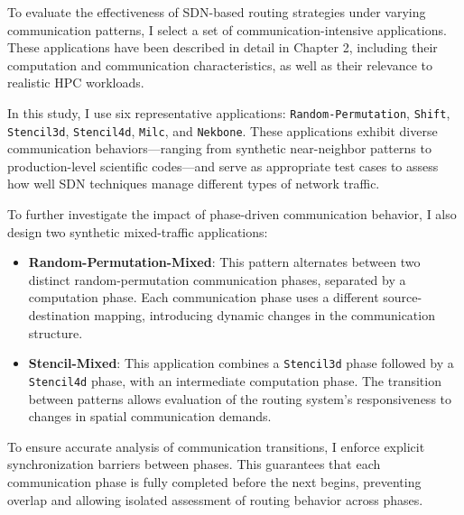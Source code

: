 To evaluate the effectiveness of SDN-based routing strategies under varying communication patterns, I select a set of communication-intensive applications. These applications have been described in detail in Chapter 2, including their computation and communication characteristics, as well as their relevance to realistic HPC workloads.

In this study, I use six representative applications: \texttt{Random-Permutation}, \texttt{Shift}, \texttt{Stencil3d}, \texttt{Stencil4d}, \texttt{Milc}, and \texttt{Nekbone}. These applications exhibit diverse communication behaviors—ranging from synthetic near-neighbor patterns to production-level scientific codes—and serve as appropriate test cases to assess how well SDN techniques manage different types of network traffic.

To further investigate the impact of phase-driven communication behavior, I also design two synthetic mixed-traffic applications:

\begin{itemize}
\item \textbf{Random-Permutation-Mixed}: This pattern alternates between two distinct random-permutation communication phases, separated by a computation phase. Each communication phase uses a different source-destination mapping, introducing dynamic changes in the communication structure.

\item \textbf{Stencil-Mixed}: This application combines a \texttt{Stencil3d} phase followed by a \texttt{Stencil4d} phase, with an intermediate computation phase. The transition between patterns allows evaluation of the routing system’s responsiveness to changes in spatial communication demands.
\end{itemize}

To ensure accurate analysis of communication transitions, I enforce explicit synchronization barriers between phases. This guarantees that each communication phase is fully completed before the next begins, preventing overlap and allowing isolated assessment of routing behavior across phases.
